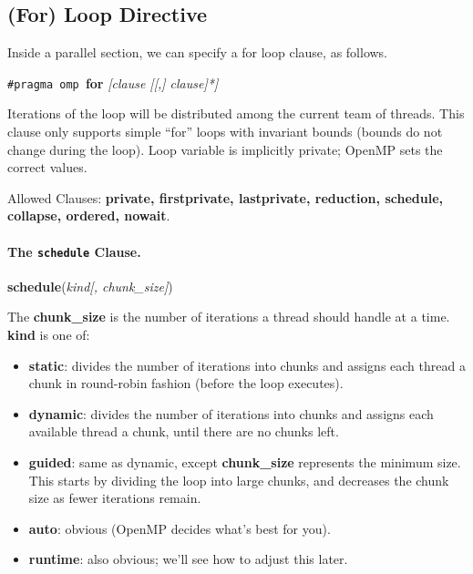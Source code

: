 \subsection*{(For) Loop Directive} Inside a parallel section, we can
specify a for loop clause, as follows.

  \begin{center}
    {\tt \#pragma omp }{\bf for} {\it [clause [[,] clause]*]}
  \end{center}

    Iterations of the loop will be distributed among the
      current team of threads.
    This clause only supports simple ``for'' loops with invariant bounds (bounds do
      not change during the loop).
    Loop variable is implicitly private; OpenMP sets the
      correct values.

  Allowed Clauses: {\bf private, firstprivate, lastprivate, reduction, schedule,
    collapse, ordered, nowait}.

\paragraph{The {\tt schedule} Clause.}

  \begin{center}
    {\bf schedule}({\it kind[, chunk\_size]})
  \end{center}

    The {\bf chunk\_size} is the number of iterations a thread
      should handle at a time. {\bf kind} is one of:
      \begin{itemize}
        \item {\bf static}:  divides the number of iterations into chunks and assigns each thread
        a chunk in round-robin fashion (before the loop executes).

        \item {\bf dynamic}: divides the number of iterations into chunks and assigns each
        available thread a chunk, until there are no chunks left.
        \item {\bf guided}:  same as dynamic, except {\bf chunk\_size} represents the minimum
        size. This starts by dividing the loop into large chunks, and decreases the
        chunk size as fewer iterations remain.
        \item {\bf auto}: obvious (OpenMP decides what's best for you).
        \item {\bf runtime}: also obvious; we'll see how to adjust this later.
      \end{itemize}


